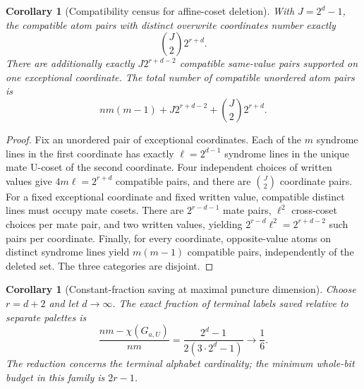 \documentclass[11pt,a4paper]{article}
\newtheorem{corollary}[theorem]{Corollary}
\begin{document}
\begin{corollary}[Compatibility census for affine-coset deletion]\label{cor:plane-extra}
With $J=2^d-1$, the compatible atom pairs with distinct overwrite
coordinates number exactly
\begin{equation}\label{eq:cross-census}
 \boxed{\quad \binom J2 2^{r+d}.\quad}
\end{equation}
There are additionally exactly $J2^{r+d-2}$ compatible same-value
pairs supported on one exceptional coordinate. The total number of
compatible unordered atom pairs is
\begin{equation}\label{eq:all-census}
 \boxed{\quad nm(m-1)+J2^{r+d-2}+\binom J2 2^{r+d}.\quad}
\end{equation}
\end{corollary}
\begin{proof}
Fix an unordered pair of exceptional coordinates. Each of the $m$
syndrome lines in the first coordinate has exactly $\ell=2^{d-1}$
syndrome lines in the unique mate U-coset of the second coordinate.
Four independent choices of written values give $4m\ell=2^{r+d}$
compatible pairs, and there are $\binom J2$ coordinate pairs.
For a fixed exceptional coordinate and fixed written value, compatible
distinct lines must occupy mate cosets. There are $2^{r-d-1}$ mate pairs,
$\ell^2$ cross-coset choices per mate pair, and two written values,
yielding $2^{r-d}\ell^2=2^{r+d-2}$ such pairs per coordinate.
Finally, for every coordinate, opposite-value atoms on distinct syndrome
lines yield $m(m-1)$ compatible pairs, independently of the deleted set.
The three categories are disjoint.
\end{proof}

\begin{corollary}[Constant-fraction saving at maximal puncture dimension]
\label{cor:constant-fraction}
Choose $r=d+2$ and let $d\to\infty$. The exact fraction of terminal
labels saved relative to separate palettes is
\begin{equation}\label{eq:frac-saving}
\frac{nm-\chi(G_{a,U})}{nm}
 =\frac{2^d-1}{2(3\cdot2^d-1)}\longrightarrow\frac16.
\end{equation}
The reduction concerns the terminal alphabet cardinality; the minimum whole-bit budget in this family is $2r-1$.
\end{corollary}
\end{document}
